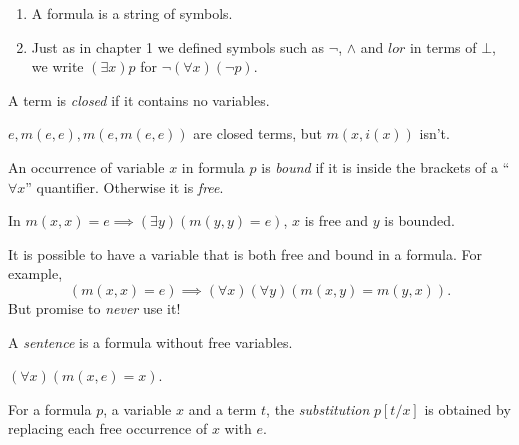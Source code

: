\documentclass[a4paper]{article}
\begin{document}
\begin{note}\leavevmode
  \begin{enumerate}
  \item A formula is a string of symbols.
  \item Just as in chapter 1 we defined symbols such as \(\neg\), \(\land\) and \(lor\) in terms of \(\bot\), we write \((\exists x) p\) for \(\neg (\forall x) (\neg p)\).
  \end{enumerate}
\end{note}

\begin{definition}[Closed]
  A term is \emph{closed} if it contains no variables.
\end{definition}

\begin{eg}
  \(e, m(e, e), m(e, m(e, e))\) are closed terms, but \(m(x, i(x))\) isn't.
\end{eg}

\begin{definition}
  An occurrence of variable \(x\) in formula \(p\) is \emph{bound} if it is inside the brackets of a ``\(\forall x\)'' quantifier. Otherwise it is \emph{free}.
\end{definition}

\begin{eg}
  In \(m(x, x) = e \implies (\exists y) (m(y, y) = e)\), \(x\) is free and \(y\) is bounded.
\end{eg}

\begin{note}
  It is possible to have a variable that is both free and bound in a formula. For example,
  \[
    (m(x, x) = e) \implies (\forall x)(\forall y) (m(x, y) = m(y, x)).
  \]
  But promise to \emph{never} use it!
\end{note}

\begin{definition}[Sentence]
  A \emph{sentence} is a formula without free variables.
\end{definition}

\begin{eg}
  \((\forall x) (m(x, e) = x)\).
\end{eg}

\begin{definition}[Substitution]
  For a formula \(p\), a variable \(x\) and a term \(t\), the \emph{substitution} \(p[t/x]\) is obtained by replacing each free occurrence of \(x\) with \(e\).
\end{definition}
\end{document}

